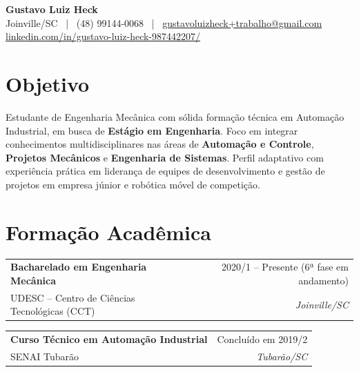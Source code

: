 \documentclass[11pt,a4paper,sans]{article}
\makeatletter
\newcommand{\educationItem}[4]{
    \noindent
    \begin{tabularx}{\textwidth}{@{} X r @{}}
        \textbf{\color{primaryColor}#1} & \small{#3} \\
        \small{#2} & \small\textit{#4} \\
    \end{tabularx}
    \vspace{2pt}
}
\makeatother
\begin{document}
\color{textColor}

\begin{center}
    {\Huge \textbf{\color{primaryColor}Gustavo Luiz Heck}} \\
    \vspace{6pt}
    \small Joinville/SC \ | \ (48) 99144-0068 \ | \ 
    \href{mailto:gustavoluizheck+trabalho@gmail.com}{gustavoluizheck+trabalho@gmail.com} \\
    \vspace{2pt}
    \href{https://www.linkedin.com/in/gustavo-luiz-heck-987442207/}{linkedin.com/in/gustavo-luiz-heck-987442207/}
\end{center}

\vspace{6pt}

\section{Objetivo}
Estudante de Engenharia Mecânica com sólida formação técnica em Automação Industrial, em busca de \textbf{Estágio em Engenharia}. Foco em integrar conhecimentos multidisciplinares nas áreas de \textbf{Automação e Controle}, \textbf{Projetos Mecânicos} e \textbf{Engenharia de Sistemas}. Perfil adaptativo com experiência prática em liderança de equipes de desenvolvimento e gestão de projetos em empresa júnior e robótica móvel de competição.

\section{Formação Acadêmica}

\educationItem
  {Bacharelado em Engenharia Mecânica}
  {UDESC -- Centro de Ciências Tecnológicas (CCT)}
  {2020/1 -- Presente (6ª fase em andamento)}
  {Joinville/SC}

\vspace{4pt}

\educationItem
  {Curso Técnico em Automação Industrial}
  {SENAI Tubarão}
  {Concluído em 2019/2}
  {Tubarão/SC}

\end{document}
